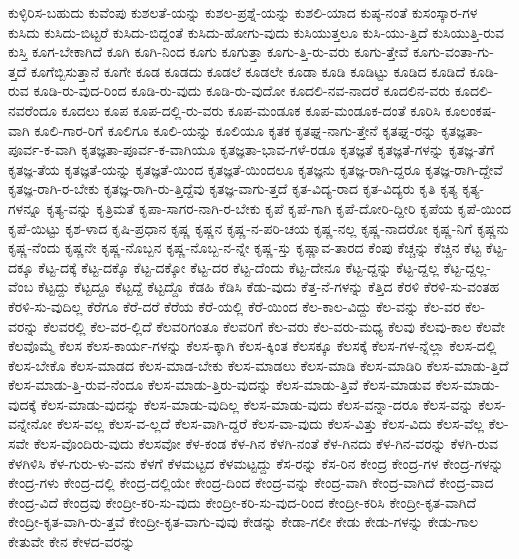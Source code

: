 {ಕುಳ್ಳಿರಿಸ-ಬಹುದು
ಕುವೆಂಪು
ಕುಶಲತೆ-ಯನ್ನು
ಕುಶಲ-ಪ್ರಶ್ನೆ-ಯನ್ನು
ಕುಶಲಿ-ಯಾದ
ಕುಷ್ಠ-ನಂತೆ
ಕುಸಂಸ್ಕಾರ-ಗಳ
ಕುಸಿದು
ಕುಸಿದು-ಬಿಟ್ಟರೆ
ಕುಸಿದು-ಬಿದ್ದಂತೆ
ಕುಸಿದು-ಹೋಗು-ವುದು
ಕುಸಿಯುತ್ತಲೂ
ಕುಸಿ-ಯು-ತ್ತಿದೆ
ಕುಸಿಯುತ್ತಿ-ರುವ
ಕುಸ್ತಿ
ಕೂಗ-ಬೇಕಾಗಿದೆ
ಕೂಗಿ
ಕೂಗಿ-ನಿಂದ
ಕೂಗು
ಕೂಗುತ್ತಾ
ಕೂಗು-ತ್ತಿ-ರು-ವರು
ಕೂಗು-ತ್ತೇವೆ
ಕೂಗು-ವಂತಾ-ಗು-ತ್ತದೆ
ಕೂಗೆಬ್ಬಿಸುತ್ತಾನೆ
ಕೂಗೇ
ಕೂಡ
ಕೂಡದು
ಕೂಡಲೆ
ಕೂಡಲೇ
ಕೂಡಾ
ಕೂಡಿ
ಕೂಡಿಟ್ಟು
ಕೂಡಿದ
ಕೂಡಿದೆ
ಕೂಡಿ-ರುವ
ಕೂಡಿ-ರು-ವುದ-ರಿಂದ
ಕೂಡಿ-ರು-ವುದು
ಕೂಡಿ-ರು-ವುದೋ
ಕೂದಲಿ-ನವ-ನಾದರೆ
ಕೂದಲಿನ-ವರು
ಕೂದಲಿ-ನವರೆಂದೂ
ಕೂದಲು
ಕೂಪ
ಕೂಪ-ದಲ್ಲಿ-ರು-ವರು
ಕೂಪ-ಮಂಡೂಕ
ಕೂಪ-ಮಂಡೂಕ-ದಂತೆ
ಕೂರಿಸಿ
ಕೂಲಂಕಷ-ವಾಗಿ
ಕೂಲಿ-ಗಾರ-ರಿಗೆ
ಕೂಲಿಗೂ
ಕೂಲಿ-ಯನ್ನು
ಕೂಲಿಯೂ
ಕೃತಕ
ಕೃತಘ್ನ-ನಾಗು-ತ್ತೇನೆ
ಕೃತಘ್ನ-ರನ್ನು
ಕೃತಜ್ಞತಾ-ಪೂರ್ವ-ಕ-ವಾಗಿ
ಕೃತಜ್ಞತಾ-ಪೂರ್ವ-ಕ-ವಾಗಿಯೂ
ಕೃತಜ್ಞತಾ-ಭಾವ-ಗಳೆ-ರಡೂ
ಕೃತಜ್ಞತೆ
ಕೃತಜ್ಞತೆ-ಗಳನ್ನು
ಕೃತಜ್ಞ-ತೆಗೆ
ಕೃತಜ್ಞ-ತೆಯ
ಕೃತಜ್ಞತೆ-ಯನ್ನು
ಕೃತಜ್ಞತೆ-ಯಿಂದ
ಕೃತಜ್ಞತೆ-ಯಿಂದಲೂ
ಕೃತಜ್ಞನು
ಕೃತಜ್ಞ-ರಾಗಿ-ದ್ದರೂ
ಕೃತಜ್ಞ-ರಾಗಿ-ದ್ದೇವೆ
ಕೃತಜ್ಞ-ರಾಗಿ-ರ-ಬೇಕು
ಕೃತಜ್ಞ-ರಾಗಿ-ರು-ತ್ತಿದ್ದೆವು
ಕೃತಜ್ಞ-ವಾಗು-ತ್ತದೆ
ಕೃತ-ವಿದ್ಯ-ರಾದ
ಕೃತ-ವಿದ್ಯರು
ಕೃತಿ
ಕೃತ್ಯ
ಕೃತ್ಯ-ಗಳನ್ನೂ
ಕೃತ್ಯ-ವನ್ನು
ಕೃತ್ರಿಮತೆ
ಕೃಪಾ-ಸಾಗರ-ನಾಗಿ-ರ-ಬೇಕು
ಕೃಪೆ
ಕೃಪೆ-ಗಾಗಿ
ಕೃಪೆ-ದೋರಿ-ದ್ದೀರಿ
ಕೃಪೆಯ
ಕೃಪೆ-ಯಿಂದ
ಕೃಪೆ-ಯಿಟ್ಟು
ಕೃಶ-ಳಾದ
ಕೃಷಿ-ಪ್ರಧಾನ
ಕೃಷ್ಣ
ಕೃಷ್ಣನ
ಕೃಷ್ಣ-ನ-ಪರಿ-ಚಯ
ಕೃಷ್ಣ-ನಲ್ಲ
ಕೃಷ್ಣ-ನಾದರೋ
ಕೃಷ್ಣ-ನಿಗೆ
ಕೃಷ್ಣನು
ಕೃಷ್ಣ-ನೆಂದು
ಕೃಷ್ಣನೇ
ಕೃಷ್ಣ-ನೊಬ್ಬನ
ಕೃಷ್ಣ-ನೊಬ್ಬ-ನ-ನ್ನೇ
ಕೃಷ್ಣ-ಸ್ತು
ಕೃಷ್ಣಾವ-ತಾರದ
ಕೆಂಪು
ಕೆಚ್ಚನ್ನು
ಕೆಚ್ಚಿನ
ಕೆಟ್ಟ
ಕೆಟ್ಟ-ದಕ್ಕೂ
ಕೆಟ್ಟ-ದಕ್ಕೆ
ಕೆಟ್ಟ-ದಕ್ಕೊ
ಕೆಟ್ಟ-ದಕ್ಕೋ
ಕೆಟ್ಟ-ದರ
ಕೆಟ್ಟ-ದೆಂದು
ಕೆಟ್ಟ-ದೇನೂ
ಕೆಟ್ಟ-ದ್ದನ್ನು
ಕೆಟ್ಟ-ದ್ದಲ್ಲ
ಕೆಟ್ಟ-ದ್ದಲ್ಲ-ವೆಂಬ
ಕೆಟ್ಟದ್ದು
ಕೆಟ್ಟದ್ದೂ
ಕೆಟ್ಟದ್ದೆ
ಕೆಟ್ಟದ್ದೊ
ಕೆಡಹಿ
ಕೆಡಿಸಿ
ಕೆಡು-ವುದು
ಕೆತ್ತ-ನೆ-ಗಳನ್ನು
ಕೆತ್ತಿದ
ಕೆರಳಿ
ಕೆರಳಿ-ಸು-ವಂತಹ
ಕೆರಳಿ-ಸು-ವುದಿಲ್ಲ
ಕೆರೆಗೂ
ಕೆರೆ-ದರೆ
ಕೆರೆಯ
ಕೆರೆ-ಯಲ್ಲಿ
ಕೆರೆ-ಯಿಂದ
ಕೆಲ-ಕಾಲ-ವಿದ್ದು
ಕೆಲ-ವನ್ನು
ಕೆಲ-ವರ
ಕೆಲ-ವರನ್ನು
ಕೆಲವರಲ್ಲಿ
ಕೆಲ-ವರ-ಲ್ಲಿದೆ
ಕೆಲವರಿಗಂತೂ
ಕೆಲವರಿಗೆ
ಕೆಲ-ವರು
ಕೆಲ-ವರು-ಮಧ್ಯ
ಕೆಲವು
ಕೆಲವು-ಕಾಲ
ಕೆಲವೇ
ಕೆಲವೊಮ್ಮೆ
ಕೆಲಸ
ಕೆಲಸ-ಕಾರ್ಯ-ಗಳನ್ನು
ಕೆಲಸ-ಕ್ಕಾಗಿ
ಕೆಲಸ-ಕ್ಕಿಂತ
ಕೆಲಸಕ್ಕೂ
ಕೆಲಸಕ್ಕೆ
ಕೆಲಸ-ಗಳ-ನ್ನೆಲ್ಲಾ
ಕೆಲಸ-ದಲ್ಲಿ
ಕೆಲಸ-ಬೇಕೊ
ಕೆಲಸ-ಮಾಡದ
ಕೆಲಸ-ಮಾಡ-ಬೇಕು
ಕೆಲಸ-ಮಾಡಲು
ಕೆಲಸ-ಮಾಡಿ
ಕೆಲಸ-ಮಾಡಿರಿ
ಕೆಲಸ-ಮಾಡು-ತ್ತಿದೆ
ಕೆಲಸ-ಮಾಡು-ತ್ತಿ-ರುವ-ನೆಂದೂ
ಕೆಲಸ-ಮಾಡು-ತ್ತಿರು-ವುದನ್ನು
ಕೆಲಸ-ಮಾಡು-ತ್ತಿವೆ
ಕೆಲಸ-ಮಾಡುವ
ಕೆಲಸ-ಮಾಡು-ವುದಕ್ಕೆ
ಕೆಲಸ-ಮಾಡು-ವುದನ್ನು
ಕೆಲಸ-ಮಾಡು-ವುದಿಲ್ಲ
ಕೆಲಸ-ಮಾಡು-ವುದು
ಕೆಲಸ-ವನ್ನಾ-ದರೂ
ಕೆಲಸ-ವನ್ನು
ಕೆಲಸ-ವನ್ನೇನೋ
ಕೆಲಸ-ವಲ್ಲ
ಕೆಲಸ-ವ-ಲ್ಲದೆ
ಕೆಲಸ-ವಾಗಿ-ದ್ದರೆ
ಕೆಲಸ-ವಾ-ವುದು
ಕೆಲಸ-ವಿತ್ತು
ಕೆಲಸ-ವಿದು
ಕೆಲಸ-ವೆಲ್ಲ
ಕೆಲ-ಸವೇ
ಕೆಲಸ-ವೊಂದಿರು-ವುದು
ಕೆಲಸವೋ
ಕೆಳ-ಕಂಡ
ಕೆಳ-ಗಿನ
ಕೆಳಗಿ-ನಂತೆ
ಕೆಳ-ಗಿನದು
ಕೆಳ-ಗಿನ-ವರನ್ನು
ಕೆಳಗಿ-ರುವ
ಕೆಳಗಿಳಿಸಿ
ಕೆಳ-ಗುರು-ಳು-ವನು
ಕೆಳಗೆ
ಕೆಳಮಟ್ಟದ
ಕೆಳಮಟ್ಟದ್ದು
ಕೆಸ-ರನ್ನು
ಕೆಸ-ರಿನ
ಕೇಂದ್ರ
ಕೇಂದ್ರ-ಗಳ
ಕೇಂದ್ರ-ಗಳನ್ನು
ಕೇಂದ್ರ-ಗಳು
ಕೇಂದ್ರ-ದಲ್ಲಿ
ಕೇಂದ್ರ-ದಲ್ಲಿಯೇ
ಕೇಂದ್ರ-ದಿಂದ
ಕೇಂದ್ರ-ವನ್ನು
ಕೇಂದ್ರ-ವಾಗಿ
ಕೇಂದ್ರ-ವಾಗಿದೆ
ಕೇಂದ್ರ-ವಾದ
ಕೇಂದ್ರ-ವಿದೆ
ಕೇಂದ್ರವು
ಕೇಂದ್ರೀ-ಕರಿ-ಸು-ವುದು
ಕೇಂದ್ರೀ-ಕರಿ-ಸು-ವುದ-ರಿಂದ
ಕೇಂದ್ರೀ-ಕರಿಸಿ
ಕೇಂದ್ರೀ-ಕೃತ-ವಾಗಿದೆ
ಕೇಂದ್ರೀ-ಕೃತ-ವಾಗಿ-ರು-ತ್ತವೆ
ಕೇಂದ್ರೀ-ಕೃತ-ವಾಗು-ವುವು
ಕೇಡನ್ನು
ಕೇಡಾ-ಗಲೀ
ಕೇಡು
ಕೇಡು-ಗಳನ್ನು
ಕೇಡು-ಗಾಲ
ಕೇತುವೇ
ಕೇನ
ಕೇಳದ-ವರನ್ನು
}
